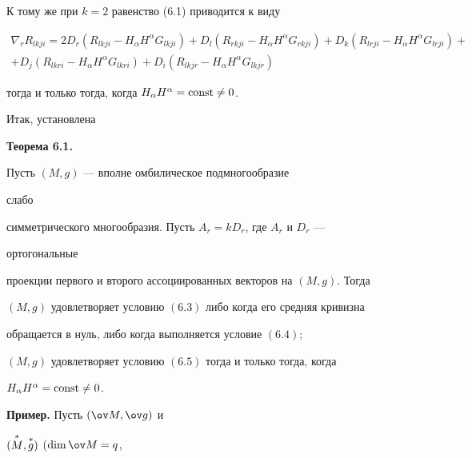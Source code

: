 К тому же при $k=2$ равенство (6.1) приводится к виду


\begin{multline}


\nabla_r R_{lkji}=2


D_r(R_{lkji}-H_\alpha H^\alpha G_{lkji})+


D_l(R_{rkji}-H_\alpha H^\alpha G_{rkji})+


D_k(R_{lrji}-H_\alpha H^\alpha G_{lrji})+ \\


+D_j(R_{lkri}-H_\alpha H^\alpha G_{lkri})+


D_i(R_{lkjr}-H_\alpha H^\alpha G_{lkjr})


\tag{6.5}


\end{multline}


тогда и только тогда, когда $H_\alpha H^\alpha=\operatorname{const}\ne 0$.





Итак, установлена


\medskip





{\bf Теорема 6.1.} {\it


Пусть $(M,g)$ --- вполне омбилическое подмногообразие


слабо


симметрического многообразия. Пусть $A_r=k D_r$, где $A_r$ и $D_r$ ---


ортогональные


проекции первого и второго ассоциированных векторов на $(M,g)$. Тогда





$(M,g)$ удовлетворяет условию $(6.3)$ либо когда его средняя кривизна


обращается в нуль, либо когда выполняется условие $(6.4);$





$(M,g)$ удовлетворяет условию $(6.5)$ тогда и только тогда, когда


$H_\alpha H^\alpha=\operatorname{const}\ne 0$.


}


\medskip





{\bf Пример.} Пусть $(\ov M,\ov g)$ и


$(\overset{*}{M}{},\overset{*}{g}{})$ ($\dim\ov M=q$,


